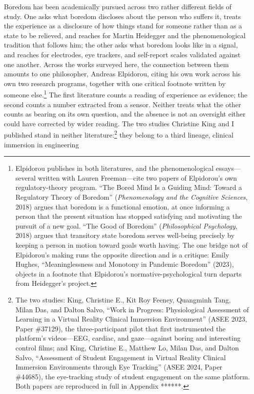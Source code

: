 Boredom has been academically pursued across two rather different fields of study. One asks
what boredom discloses about the person who suffers it, treats the experience as a disclosure
of how things stand for someone rather than as a state to be relieved, and reaches for Martin
Heidegger and the phenomenological tradition that follows him; the other asks what boredom
looks like in a signal, and reaches for electrodes, eye trackers, and self-report scales
validated against one another. Across the works surveyed here, the connection between them
amounts to one philosopher, Andreas Elpidorou, citing his own work across his own two research
programs, together with one critical footnote written by someone else.\footnote{Elpidorou
publishes in both literatures, and the phenomenological essays---several written with Lauren
Freeman---cite two papers of Elpidorou's own regulatory-theory program. ``The Bored Mind Is a
Guiding Mind: Toward a Regulatory Theory of Boredom'' (\textit{Phenomenology and the Cognitive
Sciences}, 2018) argues that boredom is a functional emotion, at once informing a person that
the present situation has stopped satisfying and motivating the pursuit of a new goal. ``The
Good of Boredom'' (\textit{Philosophical Psychology}, 2018) argues that transitory state
boredom serves well-being precisely by keeping a person in motion toward goals worth having.
The one bridge not of Elpidorou's making runs the opposite direction and is a critique:
Emily Hughes, ``Meaninglessness and Monotony in Pandemic Boredom'' (2023), objects in a footnote
that Elpidorou's normative-psychological turn departs from Heidegger's project.} The first
literature counts a reading of experience
as evidence; the second counts a number extracted from a sensor. Neither treats what the
other counts as bearing on its own question, and the absence is not an oversight either could
have corrected by wider reading. The two studies Christine King and I published stand in
neither literature:\footnote{The two studies: King, Christine E., Kit Roy Feeney, Quangminh
Tang, Milan Das, and Dalton Salvo, ``Work in Progress: Physiological Assessment of Learning
in a Virtual Reality Clinical Immersion Environment'' (ASEE 2023, Paper \#37129), the
three-participant pilot that first instrumented the platform's videos---EEG, cardiac, and
gaze---against boring and interesting control films; and King, Christine E., Matthew Lo, Milan Das, and
Dalton Salvo, ``Assessment of Student Engagement in Virtual Reality Clinical Immersion
Environments through Eye Tracking'' (ASEE 2024, Paper \#44685), the eye-tracking study of
student engagement on the same platform. Both papers are reproduced in
full in Appendix ******.} they belong to a third lineage, clinical immersion in engineering
